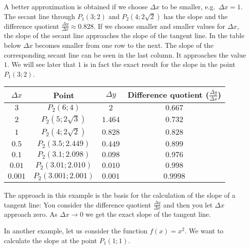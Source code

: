 \documentclass[12pt,eng]{skript_ogg}
\begin{document}
A better approximation is obtained if we choose $\Delta x$ to be smaller, e.g.\ $\Delta x=1$. The secant line through $P_1(3;2)$ and $P_2(4;2\sqrt{2})$ has the slope and the difference quotient $\frac{\Delta y}{\Delta x}\approx 0.828$. If we choose smaller and smaller values for $\Delta x$, the slope of the secant line approaches the slope of the tangent line. In the table below $\Delta x$ becomes smaller from one row to the next. The slope of the corresponding secant line can be seen in the last column. It approaches the value $1$. We will see later that $1$ is in fact the exact result for the slope in the point $P_1(3;2)$.

\begin{center}
\begin{tabular}{|c|c|c|c|}\hline
$\Delta x$& Point &$\Delta y$ & Difference quotient ($\frac{\Delta y}{\Delta x}$)\\ \hline \hline 
$3$ & $P_2(6;4)$ & $2$ & $0.667$ \\ \hline
$2$ & $P_2(5;2\sqrt{3})$ & $1.464$ & $0.732$ \\ \hline
$1$ &  $P_2(4;2\sqrt{2})$ & $0.828$ & $0.828$ \\ \hline
$0.5$ & $P_2(3.5;2.449)$ & $0.449$ & $0.899$ \\ \hline
$0.1$ & $P_2(3.1;2.098)$ & $0.098$ & $0.976$ \\ \hline
$0.01$ & $P_2(3.01;2.010)$ & $0.010$ & $0.998$ \\ \hline
$0.001$ & $P_2(3.001; 2.001)$ & $0.001$ & $0.9998$ \\ \hline
\end{tabular}
\end{center}

The approach in this example is the basis for the calculation of the slope of a tangent line: You consider the difference quotient $\frac{\Delta y}{\Delta x}$ and then you let $\Delta x$ approach zero. As $\Delta x \rightarrow 0$ we get the exact slope of the tangent line. 

In another example, let us consider the function $f(x)=x^2$. We want to calculate the slope at the point $P_1(1;1)$.

\vspace{-3mm}
\end{document}
